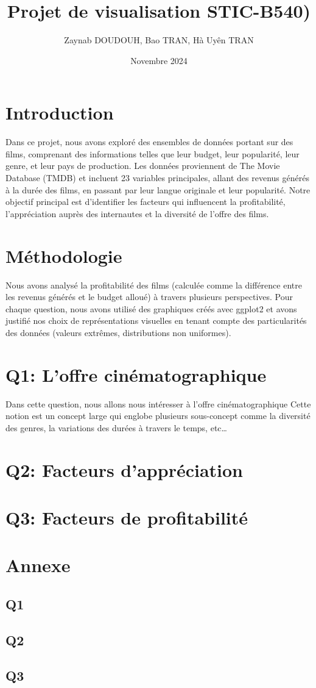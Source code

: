 \documentclass{article}
\title{Projet de visualisation STIC-B540)}
\author{Zaynab DOUDOUH, Bao TRAN, Hà Uyên TRAN }
\date{Novembre 2024}
\begin{document}
	
	\maketitle
	
\section{Introduction}
Dans ce projet, nous avons exploré des ensembles de données portant sur des films, comprenant des informations telles que leur budget, leur popularité, leur genre, et leur pays de production. Les données proviennent de The Movie Database (TMDB) et incluent 23 variables principales, allant des revenus générés à la durée des films, en passant par leur langue originale et leur popularité. Notre objectif principal est d'identifier les facteurs qui influencent la profitabilité, l'appréciation auprès des internautes et la diversité de l'offre des films.

\section{Méthodologie}
Nous avons analysé la profitabilité des films (calculée comme la différence entre les revenus générés et le budget alloué) à travers plusieurs perspectives. Pour chaque question, nous avons utilisé des graphiques créés avec ggplot2 et avons justifié nos choix de représentations visuelles en tenant compte des particularités des données (valeurs extrêmes, distributions non uniformes).

\section*{Q1: L'offre cinématographique}
Dans cette question, nous allons nous intéresser à l’offre cinématographique Cette notion est un concept large qui englobe plusieurs sous-concept comme la diversité des genres, la variations des durées à travers le temps, etc…

\section*{Q2: Facteurs d'appréciation}

\section*{Q3: Facteurs de profitabilité}
	
\section{Annexe}
\subsection*{Q1}

\subsection*{Q2}

\subsection*{Q3}
	
\end{document}
